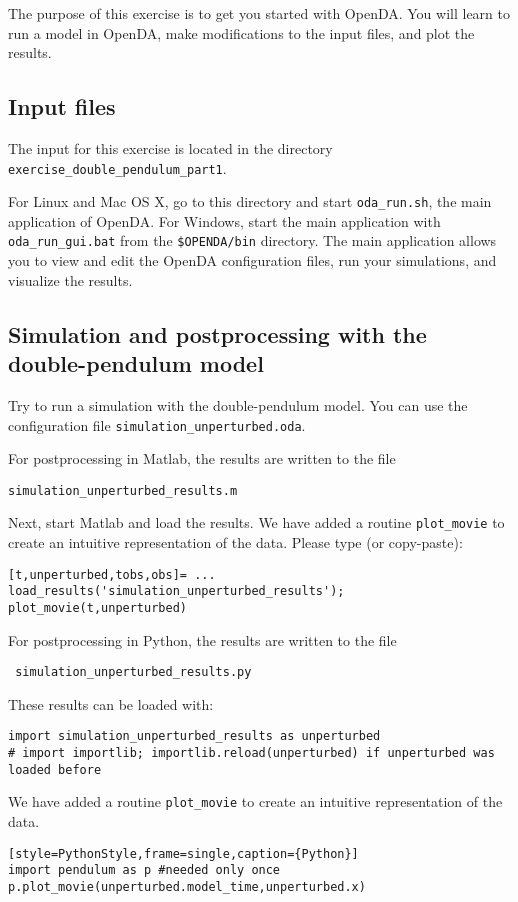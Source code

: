 The purpose of this exercise is to get you started with OpenDA. You will learn
to run a model in OpenDA, make modifications to the input files, and plot the
results.
\subsection{Input files}
The input for this exercise is located in the directory \lstinline{exercise_double_pendulum_part1}. 

For Linux and Mac OS X, go to this directory and start \lstinline{oda_run.sh}, the
main application of OpenDA. For Windows, start the main application with 
\lstinline{oda_run_gui.bat} from the \lstinline{$OPENDA/bin} directory. The main 
application allows you to view and edit the OpenDA configuration files, run your
simulations, and visualize the results.

\subsection{Simulation and postprocessing with the double-pen\-du\-lum model}
Try to run a simulation with the double-pendulum model. You can use the configuration file \lstinline{simulation_unperturbed.oda}. 

\ifshowmatlab
      For postprocessing in Matlab, the results are written to the file
      \begin{center}
        \lstinline{simulation_unperturbed_results.m}
      \end{center}
      Next, start Matlab and load the results. We have added a routine \lstinline{plot_movie} to create an intuitive
      representation of the data. Please type (or copy-paste):
      \begin{lstlisting}[style=MatlabStyle,caption={Matlab}]
[t,unperturbed,tobs,obs]= ...
load_results('simulation_unperturbed_results');
plot_movie(t,unperturbed)\end{lstlisting}
\fi
      
For postprocessing in Python, the results are written to the file
\begin{center}
  \texttt{ simulation\_unperturbed\_results.py}
\end{center}
      
      
These results can be loaded with:
\begin{lstlisting}[style=PythonStyle, caption={Python initialize}]
import simulation_unperturbed_results as unperturbed
# import importlib; importlib.reload(unperturbed) if unperturbed was loaded before\end{lstlisting}
      We have added a routine \lstinline{plot_movie} to create an intuitive
      representation of the data. 
\begin{lstlisting}[style=PythonStyle, caption={Python}][style=PythonStyle,frame=single,caption={Python}]
import pendulum as p #needed only once
p.plot_movie(unperturbed.model_time,unperturbed.x)\end{lstlisting}
      
